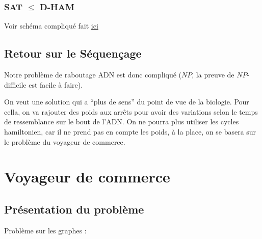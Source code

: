 \documentclass{article}
\begin{document}
      \subsubsection{SAT $\leq$ D-HAM}

        Voir schéma compliqué fait
        \href{https://gitlab.com/valoranM/latex_diagram/-/blob/main/Problem_reduction/Sat_to_Hamming/ham.pdf?ref_type=heads}{ici}

    \subsection{Retour sur le Séquençage}

      Notre problème de raboutage ADN est donc compliqué ($NP$, la preuve de
      $NP$-difficile est facile à faire).

      On veut une solution qui a ``plus de sens'' du point de vue de la
      biologie. Pour cella, on va rajouter des poids aux arrêts pour avoir des
      variations selon le temps de ressemblance sur le bout de l'ADN. On ne
      pourra plus utiliser les cycles hamiltonien, car il ne prend pas en compte
      les poids, à la place, on se basera sur le problème du voyageur de
      commerce.

  \section{Voyageur de commerce}

    \subsection{Présentation du problème}

      Problème sur les graphes :

\end{document}
